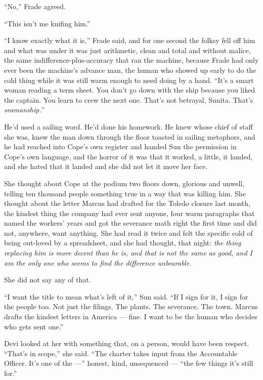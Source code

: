 \documentclass[11pt,openany]{book}
\begin{document}
``No,'' Frade agreed.

``This isn't me knifing him.''

``I know exactly what it is,'' Frade said, and for one second the folksy fell off him and what was under it was just arithmetic, clean and total and without malice, the same indifference-plus-accuracy that ran the machine, because Frade had only ever been the machine's advance man, the human who showed up early to do the cold thing while it was still warm enough to need doing by a hand. ``It's a smart woman reading a term sheet. You don't go down with the ship because you liked the captain. You learn to crew the next one. That's not betrayal, Sunita. That's \textit{seamanship.}''

He'd used a sailing word. He'd done his homework. He knew whose chief of staff she was, knew the man down through the floor toasted in sailing metaphors, and he had reached into Cope's own register and handed Sun the permission in Cope's own language, and the horror of it was that it worked, a little, it landed, and she hated that it landed and she did not let it move her face.

She thought about Cope at the podium two floors down, glorious and unwell, telling ten thousand people something true in a way that was killing him. She thought about the letter Marcus had drafted for the Toledo closure last month, the kindest thing the company had ever sent anyone, four warm paragraphs that named the workers' years and got the severance math right the first time and did not, anywhere, want anything. She had read it twice and felt the specific cold of being out-loved by a spreadsheet, and she had thought, that night: \textit{the thing replacing him is more decent than he is, and that is not the same as good, and I am the only one who seems to find the difference unbearable.}

She did not say any of that.

``I want the title to mean what's left of it,'' Sun said. ``If I sign for it, I sign for the people too. Not just the filings. The plants. The severance. The town. Marcus drafts the kindest letters in America --- fine. I want to be the human who decides who gets sent one.''

Devi looked at her with something that, on a person, would have been respect. ``That's in scope,'' she said. ``The charter takes input from the Accountable Officer. It's one of the ---'' honest, kind, unsequenced --- ``the few things it's still for.''
\end{document}

